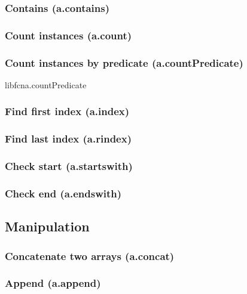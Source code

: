 \documentclass{article}
\theoremstyle{definition}
\begin{document}
\subsubsection{Contains (a.contains)}

\subsubsection{Count instances (a.count)}

\subsubsection{Count instances by predicate (a.countPredicate)}
libfcn{a.countPredicate}

\subsubsection{Find first index (a.index)}

\subsubsection{Find last index (a.rindex)}

\subsubsection{Check start (a.startswith)}

\subsubsection{Check end (a.endswith)}

\subsection{Manipulation}

\subsubsection{Concatenate two arrays (a.concat)}

\subsubsection{Append (a.append)}
\end{document}
